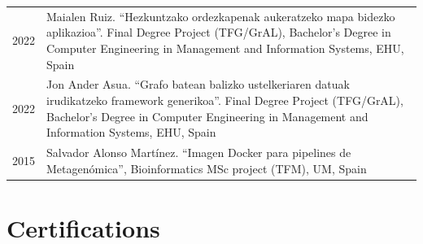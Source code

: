 \documentclass[11pt,fullpage]{article}
\begin{document}
\begin{longtable}{p{0.5in}|p{5.5in}}
2022 & Maialen Ruiz. ``Hezkuntzako ordezkapenak aukeratzeko mapa bidezko aplikazioa''. Final Degree Project (TFG/GrAL), Bachelor's Degree in Computer Engineering in Management and Information Systems, EHU, Spain \\
2022 & Jon Ander Asua. ``Grafo batean balizko ustelkeriaren datuak irudikatzeko framework generikoa''. Final Degree Project (TFG/GrAL), Bachelor's Degree in Computer Engineering in Management and Information Systems, EHU, Spain \\
2015 & Salvador Alonso Mart\'inez. ``Imagen Docker para pipelines de Metagen\'omica'', Bioinformatics MSc project (TFM), UM, Spain \\

\end{longtable}

\section*{Certifications}
\end{document}

